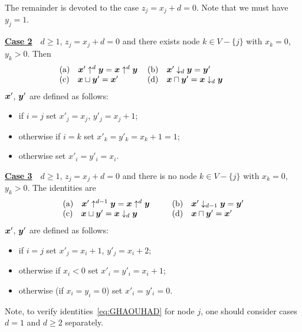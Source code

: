 \documentclass[11pt,onecolumn]{article}
\newcommand{\bx}{\mbox{\boldmath $x$}}
\newcommand{\by}{\mbox{\boldmath $y$}}
\begin{document}
The remainder is devoted to the case $z_j=x_j+d=0$. Note that we must have $y_j=1$.

\vspace{3pt}
\noindent \underline{\bf Case 2}~~$d\ge 1$, $z_j=x_j+d=0$ and there exists node $k\in V-\{j\}$ with $x_k=0$, $y_k>0$.  Then
\begin{equation}
\begin{tabular}{ll}
(a)$\quad \bx' \uparrow^{d} \by =  \bx \uparrow^d \by$ &
(b)$\quad \bx' \downarrow_{d} \by = \by' $ \\
(c)$\quad \bx \sqcup \by' =  \bx' $ &
(d)$\quad \bx \sqcap \by' = \bx \downarrow_d \by \qquad \quad  $ 
\end{tabular}
\end{equation}
$\bx'$, $\by'$ are defined as follows: 
\begin{itemize}
\item if $i=j$ set $x'_j=x_j$, $y'_j=x_j+1$; 
\item otherwise if $i=k$ set $x'_k=y'_k=x_k+1=1$;
\item otherwise set $x'_i=y'_i=x_i$.
\end{itemize}

\vspace{3pt}
\noindent \underline{\bf Case 3}~~$d\ge 1$, $z_j=x_j+d=0$ and there is no node $k\in V-\{j\}$ with $x_k=0$, $y_k>0$. 
The identities are
\begin{equation}
\begin{tabular}{ll}
(a)$\quad \bx' \uparrow^{d-1} \by =  \bx \uparrow^d \by$ &
(b)$\quad \bx' \downarrow_{d-1} \by = \by' $ \\
(c)$\quad \bx \sqcup \by' =  \bx \downarrow_d \by \qquad \quad$ &
(d)$\quad \bx \sqcap \by' =  \bx'  $ 
\label{eq:GHAOUHAD}
\end{tabular}
\end{equation}
$\bx'$, $\by'$ are defined as follows: 
\begin{itemize}
\item if $i=j$ set $x'_j=x_i+1$, $y'_j=x_i+2$; 
\item otherwise if $x_i<0$ set $x'_i=y'_i=x_i+1$;
\item otherwise (if $x_i=y_i=0$) set $x'_i=y'_i=0$.
\end{itemize}
Note, to verify identities~\eqref{eq:GHAOUHAD} for node $j$, one should consider cases $d=1$ and $d\ge 2$ separately. 
\end{document}
